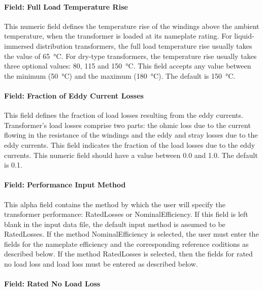 \paragraph{Field: Full Load Temperature Rise}\label{field-full-load-temperature-rise}

This numeric field defines the temperature rise of the windings above the ambient temperature, when the transformer is loaded at its nameplate rating. For liquid-immersed distribution transformers, the full load temperature rise usually takes the value of \SI{65}{\celsius}. For dry-type transformers, the temperature rise usually takes three optional values: 80, 115 and \SI{150}{\celsius}. This field accepts any value between the minimum (\SI{50}{\celsius}) and the maximum (\SI{180}{\celsius}). The default is \SI{150}{\celsius}.

\paragraph{Field: Fraction of Eddy Current Losses}\label{field-fraction-of-eddy-current-losses}

This field defines the fraction of load losses resulting from the eddy currents. Transformer's load losses comprise two parts: the ohmic loss due to the current flowing in the resistance of the windings and the eddy and stray losses due to the eddy currents. This field indicates the fraction of the load losses due to the eddy currents. This numeric field should have a value between 0.0 and 1.0. The default is 0.1.

\paragraph{Field: Performance Input Method}\label{field-performance-input-method-000}

This alpha field contains the method by which the user will specify the transformer performance: RatedLosses or NominalEfficiency. If this field is left blank in the input data file, the default input method is assumed to be RatedLosses. If the method NominalEfficiency is selected, the user must enter the fields for the nameplate efficiency and the corresponding reference coditions as described below. If the method RatedLosses is selected, then the fields for rated no load loss and load loss must be entered as described below.

\paragraph{Field: Rated No Load Loss}\label{field-rated-no-load-loss}

